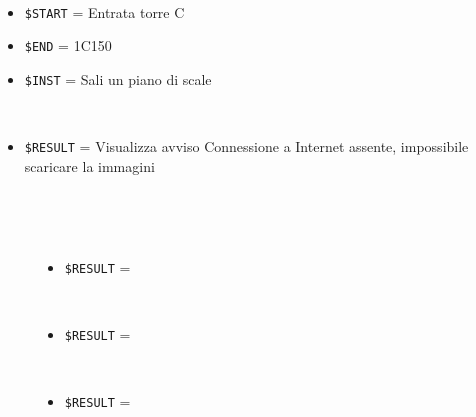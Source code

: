 \documentclass[../../SperimentazioniPratiche.tex]{subfiles}
\begin{document}
			\begin{tcolorbox}[fonttitle=\bfseries, 
								adjusted title={\Large Prova 14A.1}, 
								breakable, 
								sharp corners=south,
								colback=white, 
								colframe=white!60!black]
								
				\begin{description}[leftmargin=0.7cm,labelwidth=!]
				
					\item[Input] \ \par 
        				\begin{itemize}
        					\item \verb|$START| = Entrata torre C
        					\item \verb|$END| = 1C150
							\item \verb|$INST| = Sali un piano di scale
        				\end{itemize}
        				
        			\tcbline 
        				
        			\item[Output atteso] \ \par
        				\begin{itemize}
        					\item \verb|$RESULT| = Visualizza avviso Connessione a Internet assente, impossibile scaricare la immagini
        				\end{itemize}

					\tcbline        				
        				
        			\item[Output riscontrato] \ \par
        				\begin{description}
        				
        					\item[\dispositivoA] \ \par
        					\begin{itemize}
        						\item \verb|$RESULT| = \ok
        					\end{itemize}      					
        					
        					\item[\dispositivoB] \ \par
        					\begin{itemize}
        						\item \verb|$RESULT| = \ok
        					\end{itemize}
        					
							\item[\dispositivoC] \ \par
        					\begin{itemize}
        						\item \verb|$RESULT| = \ok
        					\end{itemize}        					
        					
        				\end{description}
        				
				\end{description}  
				
			\end{tcolorbox}
\end{document}
